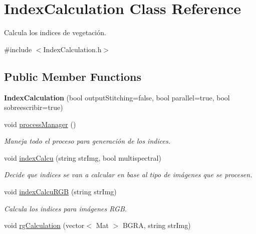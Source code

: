 \hypertarget{classIndexCalculation}{}\section{Index\+Calculation Class Reference}
\label{classIndexCalculation}


Calcula los indices de vegetación.  




{\ttfamily \#include $<$Index\+Calculation.\+h$>$}

\subsection*{Public Member Functions}
\begin{DoxyCompactItemize}
\item 
\mbox{\label{classIndexCalculation_aeddaf18ed523bb71a75d773cb1febaa1}} 
{\bfseries Index\+Calculation} (bool output\+Stitching=false, bool parallel=true, bool sobreescribir=true)
\item 
\mbox{\label{classIndexCalculation_a4890d5b4758672dfba23830b59b18892}} 
void \mbox{\hyperlink{classIndexCalculation_a4890d5b4758672dfba23830b59b18892}{process\+Manager}} ()
\begin{DoxyCompactList}\small\item\em Maneja todo el proceso para generación de los indices. \end{DoxyCompactList}\item 
void \mbox{\hyperlink{classIndexCalculation_a07039b532b218e5cfe1e603966017373}{index\+Calcu}} (string str\+Img, bool multispectral)
\begin{DoxyCompactList}\small\item\em Decide que indices se van a calcular en base al tipo de imágenes que se procesen. \end{DoxyCompactList}\item 
void \mbox{\hyperlink{classIndexCalculation_a7070ce3aebd8abd71074270eff8f88b6}{index\+Calcu\+R\+GB}} (string str\+Img)
\begin{DoxyCompactList}\small\item\em Calcula los indices para imágenes R\+GB. \end{DoxyCompactList}\item 
void \mbox{\hyperlink{classIndexCalculation_a562111a1b8920fa0136811ecd7e51e36}{rg\+Calculation}} (vector$<$ Mat $>$ B\+G\+RA, string str\+Img)

\end{DoxyCompactItemize}
